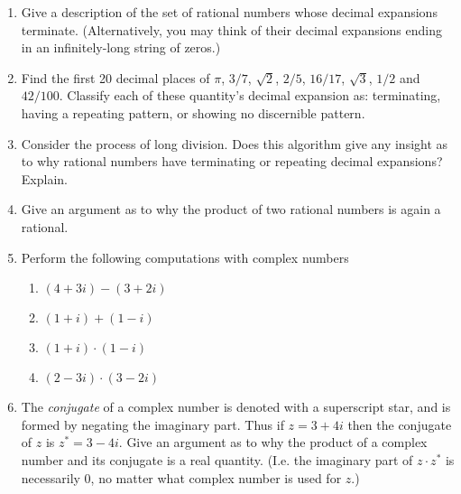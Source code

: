 \begin{enumerate}
\vfill

\item Give a description of the set of rational numbers whose decimal
expansions terminate.  (Alternatively, you may think of their decimal
expansions ending in an infinitely-long string of zeros.)

\vfill

\item Find the first 20 decimal places of $\pi$, $3/7$, $\sqrt{2}$, 
  $2/5$, $16/17$, $\sqrt{3}$, $1/2$ and $42/100$.  Classify each of
these quantity's decimal expansion as: terminating, having a repeating
pattern, or showing no discernible pattern.

\vfill

\workbookpagebreak
 
\item Consider the process of long division.  Does this algorithm give
any insight as to why rational numbers have terminating or repeating
decimal expansions?  Explain.

\vfill

\item Give an argument as to why the product of two rational numbers
is again a rational.

\vfill

\item Perform the following computations with complex numbers

  \begin{enumerate}
  \item \rule{0pt}{20pt}$ (4 + 3i) - (3 + 2i) $
  \item \rule{0pt}{20pt}$ (1 + i) + (1 - i) $
  \item \rule{0pt}{20pt}$ (1 + i) \cdot (1 - i) $
  \item \rule{0pt}{20pt}$ (2 - 3i) \cdot (3 - 2i) $
  \end{enumerate}

\vfill

\textbookpagebreak

\item The {\em conjugate} of a complex number is denoted with a
  superscript star, and is formed by negating the imaginary part.
  Thus if $z = 3+ 4i$ then the conjugate of $z$ is  $z^\ast = 3-4i$.
  Give an argument as to why the product of a complex number and its
  conjugate is a real quantity.  (I.e. the imaginary part of
  $z\cdot z^\ast$ is necessarily 0, no matter what complex number is
  used for $z$.) 

\workbookpagebreak

\end{enumerate}




